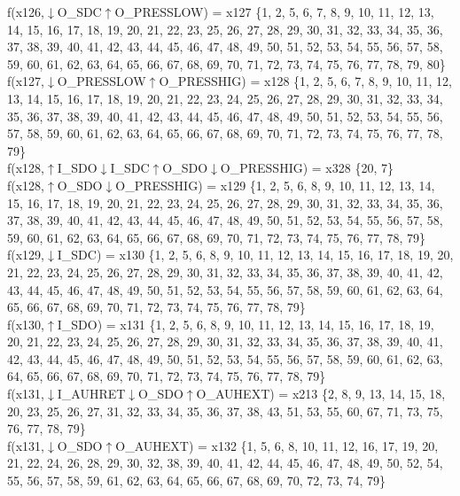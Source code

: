 f(x126,$\downarrow$O\_SDC$\uparrow$O\_PRESSLOW) = x127 \{1, 2, 5, 6, 7, 8, 9, 10, 11, 12, 13, 14, 15, 16, 17, 18, 19, 20, 21, 22, 23, 25, 26, 27, 28, 29, 30, 31, 32, 33, 34, 35, 36, 37, 38, 39, 40, 41, 42, 43, 44, 45, 46, 47, 48, 49, 50, 51, 52, 53, 54, 55, 56, 57, 58, 59, 60, 61, 62, 63, 64, 65, 66, 67, 68, 69, 70, 71, 72, 73, 74, 75, 76, 77, 78, 79, 80\} \\  
f(x127,$\downarrow$O\_PRESSLOW$\uparrow$O\_PRESSHIG) = x128 \{1, 2, 5, 6, 7, 8, 9, 10, 11, 12, 13, 14, 15, 16, 17, 18, 19, 20, 21, 22, 23, 24, 25, 26, 27, 28, 29, 30, 31, 32, 33, 34, 35, 36, 37, 38, 39, 40, 41, 42, 43, 44, 45, 46, 47, 48, 49, 50, 51, 52, 53, 54, 55, 56, 57, 58, 59, 60, 61, 62, 63, 64, 65, 66, 67, 68, 69, 70, 71, 72, 73, 74, 75, 76, 77, 78, 79\} \\  
f(x128,$\uparrow$I\_SDO$\downarrow$I\_SDC$\uparrow$O\_SDO$\downarrow$O\_PRESSHIG) = x328 \{20, 7\} \\  
f(x128,$\uparrow$O\_SDO$\downarrow$O\_PRESSHIG) = x129 \{1, 2, 5, 6, 8, 9, 10, 11, 12, 13, 14, 15, 16, 17, 18, 19, 20, 21, 22, 23, 24, 25, 26, 27, 28, 29, 30, 31, 32, 33, 34, 35, 36, 37, 38, 39, 40, 41, 42, 43, 44, 45, 46, 47, 48, 49, 50, 51, 52, 53, 54, 55, 56, 57, 58, 59, 60, 61, 62, 63, 64, 65, 66, 67, 68, 69, 70, 71, 72, 73, 74, 75, 76, 77, 78, 79\} \\  
f(x129,$\downarrow$I\_SDC) = x130 \{1, 2, 5, 6, 8, 9, 10, 11, 12, 13, 14, 15, 16, 17, 18, 19, 20, 21, 22, 23, 24, 25, 26, 27, 28, 29, 30, 31, 32, 33, 34, 35, 36, 37, 38, 39, 40, 41, 42, 43, 44, 45, 46, 47, 48, 49, 50, 51, 52, 53, 54, 55, 56, 57, 58, 59, 60, 61, 62, 63, 64, 65, 66, 67, 68, 69, 70, 71, 72, 73, 74, 75, 76, 77, 78, 79\} \\  
f(x130,$\uparrow$I\_SDO) = x131 \{1, 2, 5, 6, 8, 9, 10, 11, 12, 13, 14, 15, 16, 17, 18, 19, 20, 21, 22, 23, 24, 25, 26, 27, 28, 29, 30, 31, 32, 33, 34, 35, 36, 37, 38, 39, 40, 41, 42, 43, 44, 45, 46, 47, 48, 49, 50, 51, 52, 53, 54, 55, 56, 57, 58, 59, 60, 61, 62, 63, 64, 65, 66, 67, 68, 69, 70, 71, 72, 73, 74, 75, 76, 77, 78, 79\} \\  
f(x131,$\downarrow$I\_AUHRET$\downarrow$O\_SDO$\uparrow$O\_AUHEXT) = x213 \{2, 8, 9, 13, 14, 15, 18, 20, 23, 25, 26, 27, 31, 32, 33, 34, 35, 36, 37, 38, 43, 51, 53, 55, 60, 67, 71, 73, 75, 76, 77, 78, 79\} \\  
f(x131,$\downarrow$O\_SDO$\uparrow$O\_AUHEXT) = x132 \{1, 5, 6, 8, 10, 11, 12, 16, 17, 19, 20, 21, 22, 24, 26, 28, 29, 30, 32, 38, 39, 40, 41, 42, 44, 45, 46, 47, 48, 49, 50, 52, 54, 55, 56, 57, 58, 59, 61, 62, 63, 64, 65, 66, 67, 68, 69, 70, 72, 73, 74, 79\} \\  
